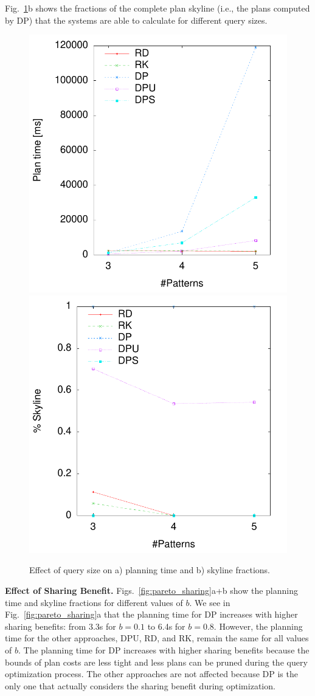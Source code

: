 Fig.~\ref{fig:pareto_tp}b shows the fractions of the complete plan
skyline (i.e., the plans computed by DP) that the systems are able to
calculate for different query sizes. 

\begin{figure}[htb]
  \centering
  \includegraphics[width=0.49\linewidth]{figs/pareto_plan_tp.pdf}
  \includegraphics[width=0.49\linewidth]{figs/plans_skyline_by_tp.pdf}
  \caption{Effect of query size on a) planning time and b) skyline fractions.}
  \label{fig:pareto_tp}
\end{figure}

\textbf{Effect of Sharing Benefit.} Figs.~\ref{fig:pareto_sharing}a+b
show the planning time and skyline fractions for different values of
$b$. We see in Fig.~\ref{fig:pareto_sharing}a that the planning time
for DP increases with higher sharing benefits: from 3.3s for $b=0.1$
to 6.4s for $b=0.8$. However, the planning time for the other
approaches, DPU, RD, and RK, remain the same for all values of
$b$. The planning time for DP increases with higher sharing benefits
because the bounds of plan costs are less tight and less plans can be
pruned during the query optimization process. The other approaches are
not affected because DP is the only one that actually considers the
sharing benefit during optimization.

